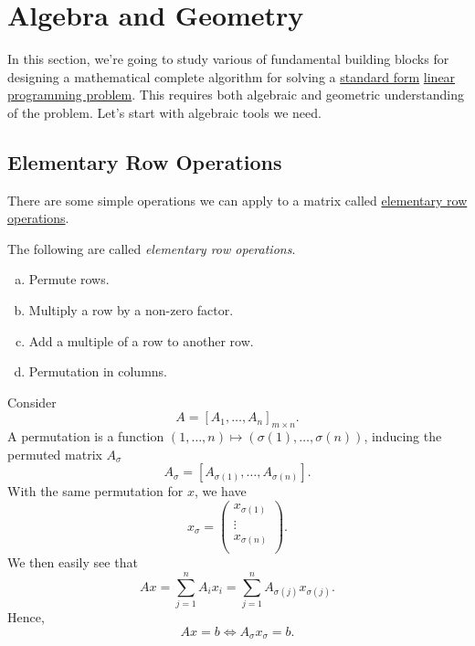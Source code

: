 \chapter{Algebra and Geometry}
In this section, we're going to study various of fundamental building blocks for designing a mathematical complete algorithm for solving a \hyperref[def:standard-form]{standard form} \hyperref[def:general-linear-programming-problem]{linear programming problem}. This requires both algebraic and geometric understanding of the problem. Let's start with algebraic tools we need.

\section{Elementary Row Operations}
There are some simple operations we can apply to a matrix called \hyperref[def:elementary-row-operations]{elementary row operations}.

\begin{definition}\label{def:elementary-row-operations}
	The following are called \emph{elementary row operations}.
	\begin{enumerate}[(a)]
		\item Permute rows.
		\item Multiply a row by a non-zero factor.
		\item Add a multiple of a row to another row.
		\item Permutation in columns.
	\end{enumerate}
\end{definition}

\begin{note}
	Consider
	\[
		A = \left[ A_1, \dots , A_n \right]_{m\times n} .
	\]
	A permutation is a function \((1, \dots , n) \mapsto (\sigma(1), \dots , \sigma(n))\), inducing the permuted matrix \(A_{\sigma}\)
	\[
		A_{\sigma} = \left[ A_{\sigma(1)}, \dots , A_{\sigma(n)} \right].
	\]
	With the same permutation for \(x\), we have
	\[
		x_{\sigma} = \begin{pmatrix}
			x_{\sigma(1)} \\
			\vdots        \\
			x_{\sigma(n)} \\
		\end{pmatrix}.
	\]
	We then easily see that
	\[
		Ax = \sum\limits_{j=1}^{n} A_i x_i = \sum\limits_{j=1}^{n} A_{\sigma(j)}x_{\sigma(j)}.
	\]
	Hence,
	\[
		Ax = b \iff A_{\sigma} x_{\sigma} = b.
	\]
\end{note}

